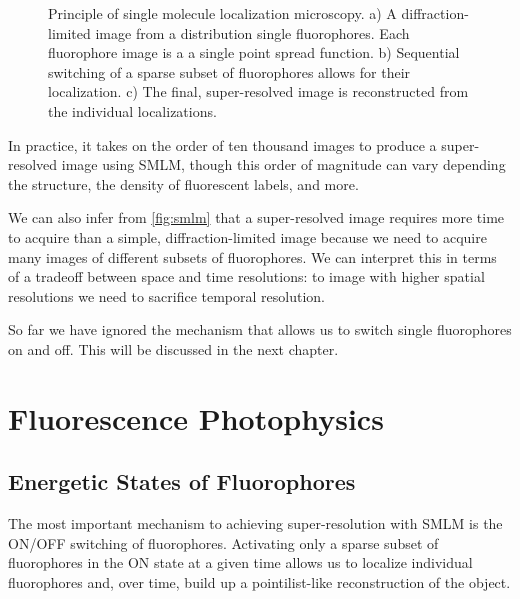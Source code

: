 \documentclass[10pt,a4paper,oneside]{book}
\begin{document}
\begin{figure}
    \centering
    \caption{Principle of single molecule localization microscopy. a) A diffraction-limited image from a distribution single fluorophores. Each fluorophore image is a a single point spread function. b) Sequential switching of a sparse subset of fluorophores allows for their localization. c) The final, super-resolved image is reconstructed from the individual localizations.}
    \label{fig:smlm}
\end{figure}

In practice, it takes on the order of ten thousand images to produce a super-resolved image using SMLM, though this order of magnitude can vary depending the structure, the density of fluorescent labels, and more.

We can also infer from \autoref{fig:smlm} that a super-resolved image requires more time to acquire than a simple, diffraction-limited image because we need to acquire many images of different subsets of fluorophores. We can interpret this in terms of a tradeoff between space and time resolutions: to image with higher spatial resolutions we need to sacrifice temporal resolution.

So far we have ignored the mechanism that allows us to switch single fluorophores on and off. This will be discussed in the next chapter.

\chapter{Fluorescence Photophysics}

\section{Energetic States of Fluorophores}

The most important mechanism to achieving super-resolution with SMLM is the ON/OFF switching of fluorophores. Activating only a sparse subset of fluorophores in the ON state at a given time allows us to localize individual fluorophores and, over time, build up a pointilist-like reconstruction of the object.
\end{document}
